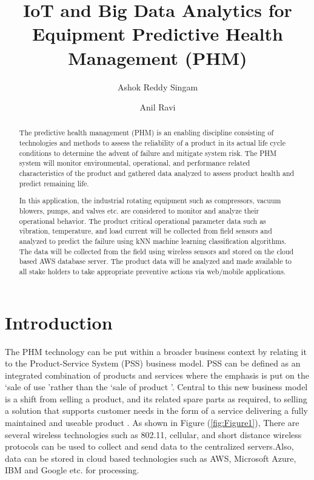 \documentclass[sigconf]{acmart}
\begin{document}
\title{IoT and Big Data Analytics for Equipment Predictive Health Management (PHM)}
\author{Ashok Reddy Singam}
\author{Anil Ravi}
\begin{abstract}
The predictive health management (PHM) is an enabling discipline consisting of technologies and methods to assess the reliability of a product in its actual life cycle conditions to determine the advent of failure and mitigate system risk. The PHM system will monitor environmental, operational, and performance related characteristics of the product and gathered data analyzed to assess product health and predict remaining life. 

In this application, the industrial rotating equipment such as compressors, vacuum blowers, pumps, and valves etc. are considered to monitor and analyze their operational behavior. The product critical operational parameter data such as vibration, temperature, and load current will be collected from field sensors and analyzed to predict the failure using kNN machine learning classification algorithms. The data will be collected from the field using wireless sensors and stored on the cloud based AWS database server. The product data will be analyzed and made available to all stake holders to take appropriate preventive actions via web/mobile applications.
\end{abstract}
\maketitle
\section{Introduction}
The PHM technology can be put within a broader business context by relating it to the Product-Service System (PSS) business model. PSS can be defined as an integrated combination of products and services where the emphasis is put on the \lq sale of use \rq rather than the \lq sale of product \rq. Central to this new business model is a shift from selling a product, and its related spare parts as required, to selling a solution that supports customer needs in the form of a service delivering a fully maintained and useable product \cite{Tonci2009}. As shown in Figure (\ref{fig:Figure1}), There are several wireless technologies such as 802.11, cellular, and short distance wireless protocols  can be used to collect and send data to the centralized servers.Also, data can be stored in cloud based technologies such as AWS, Microsoft Azure, IBM and Google etc. for processing. 
\end{document}
